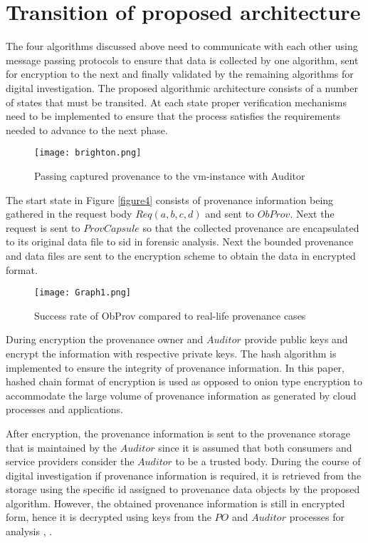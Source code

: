 \documentclass[conference]{IEEEtran}
\begin{document}
\section{Transition of proposed architecture}

The four algorithms discussed above need to communicate with each other using message passing protocols to ensure that data is collected by one algorithm, sent for encryption to the next and finally validated by the remaining algorithms for digital investigation. The proposed algorithmic architecture consists of a number of states that must be transited. At each state proper verification mechanisms need to be implemented to ensure that the process satisfies the requirements needed to advance to the next phase.


\begin{figure*}[t!]
\centering
\texttt{[image: brighton.png]}
\caption{Passing captured provenance to the vm-instance with Auditor}
\label{figure8}
\end{figure*}




The start state in Figure \ref{figure4} consists of provenance information being gathered in the request body $Req(a,b,c,d)$ and sent to $ObProv$. Next the request is sent to $ProvCapsule$ so that the collected provenance are encapsulated to its original data file to sid in forensic analysis. Next the bounded provenance and data files are sent to the encryption scheme to obtain the data in encrypted format.

\begin{figure}[t!]
\centering
\texttt{[image: Graph1.png]}
\caption{Success rate of ObProv compared to real-life provenance cases}
\label{figure9}
\end{figure}

During encryption the provenance owner and $Auditor$ provide public keys and encrypt the information with respective private keys. The hash algorithm is implemented to ensure the integrity of provenance information. In this paper, hashed chain format of encryption is used as opposed to onion type encryption to accommodate the large volume of provenance information as generated by cloud processes and applications.

After encryption, the provenance information is sent to the provenance storage that is maintained by the $Auditor$ since it is assumed that both consumers and service providers consider the $Auditor$ to be a trusted body. During the course of digital investigation if provenance information is required, it is retrieved from the storage using the specific id assigned to provenance data objects by the proposed algorithm. However, the obtained provenance information is still in encrypted form, hence it is decrypted using keys from the $PO$ and $Auditor$ processes for analysis \cite{dastjerdi2012autonomous}, \cite{slipetskyy2011security}.
\end{document}
